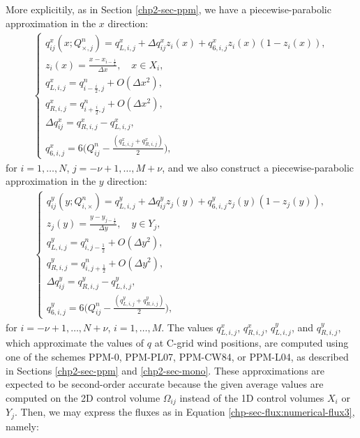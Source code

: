 More explicitily, as in Section \ref{chp2-sec-ppm}, 
we have a piecewise-parabolic approximation in the $x$ direction:
\begin{align}
	\label{chp3-ppmx-eq1}
	\begin{cases}
    q_{ij}^x(x;Q_{\times, j}^n) = q_{L,i,j}^x + \Delta q_{ij}^x z_i(x) + q_{6, i,j}^xz_i(x)(1-z_i(x)), \\
	z_i(x) = \frac{x-x_{i-\frac{1}{2}}}{\Delta x},
	\quad x \in X_i,\\
    q_{L, i,j}^x = q_{i-\frac{i}{2},j}^n+ O(\Delta x^2),\\
    q_{R, i,j}^x = q_{i+\frac{i}{2},j}^n+ O(\Delta x^2),\\
	\Delta q_{ij}^x = q_{R, i,j}^x - q_{L, i,j}^x,\\
	q_{6,i,j}^x = 6\bigg(Q_{ij}^n - \frac{(q_{L,i,j}^x + q_{R,i,j}^x)}{2}\bigg),
	\end{cases}
\end{align}
for $i=1, \ldots, N$, $j=-\nu+1, \ldots, M + \nu$, and we also construct a piecewise-parabolic
approximation in the $y$ direction:
\begin{align}
	\label{chp3-ppmy-eq2}
	\begin{cases}
	q_{ij}^y(y;Q_{i,\times}^n) = q_{L,i,j}^y + \Delta q_{ij}^y z_j(y) + q_{6, i,j}^yz_j(y)(1-z_j(y)),\\ 
	z_j(y) = \frac{y-y_{j-\frac{1}{2}}}{\Delta y},
	\quad y \in Y_j,\\
    q_{L, i,j}^y = q_{i,j-\frac{1}{2}}^n+ O(\Delta y^2),\\
    q_{R, i,j}^y = q_{i,j+\frac{1}{2}}^n+ O(\Delta y^2),\\
	\Delta q_{ij}^y = q_{R, i,j}^y - q_{L, i,j}^y,\\
	q_{6,i,j}^y = 6\bigg(Q_{ij}^n - \frac{(q_{L,i,j}^y + q_{R,i,j}^y)}{2}\bigg),
    \end{cases}
\end{align}
for $i=-\nu+1, \ldots, N + \nu$, $i=1, \ldots, M$.
The values $q_{L,i,j}^x$, $q_{R,i,j}^x$, $q_{L,i,j}^y$, and $q_{R,i,j}^y$,
which approximate the values of $q$ at C-grid wind positions, are computed
using one of the schemes PPM-0, PPM-PL07, PPM-CW84, or PPM-L04, as described
in Sections \ref{chp2-sec-ppm} and \ref{chp2-sec-mono}.
These approximations are expected to be
second-order accurate because the given average values are computed on the
2D control volume $\Omega_{ij}$ instead of the 1D control volumes $X_i$ or $Y_j$.
Then, we may express the fluxes as in Equation \eqref{chp-sec-flux:numerical-flux3}, namely:
